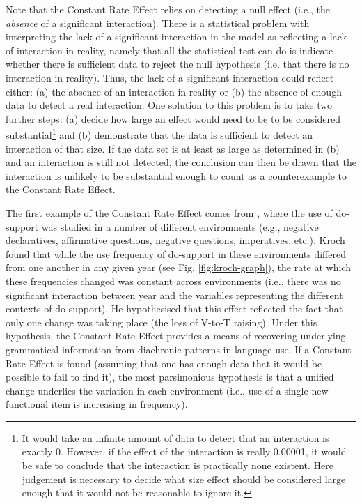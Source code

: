 	Note that the Constant Rate Effect relies on detecting a null effect (i.e., the \textit{absence} of a significant interaction). There is a statistical problem with interpreting the lack of a significant interaction in the model as reflecting a lack of interaction in reality, namely that all the statistical test can do is indicate whether there is sufficient data to reject the null hypothesis (i.e. that there is no interaction in reality). Thus, the lack of a significant interaction could reflect either: (a) the absence of an interaction in reality or (b) the absence of enough data to detect a real interaction. One solution to this problem is to take two further steps: (a) decide how large an effect would need to be to be considered substantial\footnote{It would take an infinite amount of data to detect that an interaction is exactly 0. However, if the effect of the interaction is really 0.00001, it would be safe to conclude that the interaction is practically none existent. Here judgement is necessary to decide what size effect should be considered large enough that it would not be reasonable to ignore it.} and (b) demonstrate that the data is sufficient to detect an interaction of that size. If the data set is at least as large as determined in (b) and an interaction is still not detected, the conclusion can then be drawn that the interaction is unlikely to be substantial enough to count as a counterexample to the Constant Rate Effect.

	The first example of the Constant Rate Effect comes from \cite{Kroch.1989}, where the use of do-support was studied in a number of different environments (e.g., negative declaratives, affirmative questions, negative questions, imperatives, etc.). Kroch found that while the use frequency of do-support in these environments differed from one another in any given year (see Fig. \ref{fig:kroch-graph}), the rate at which these frequencies changed was constant across environments (i.e., there was no significant interaction between year and the variables representing the different contexts of do support). He hypothesised that this effect reflected the fact that only one change was taking place (the loss of V-to-T raising). Under this hypothesis, the Constant Rate Effect provides a means of recovering underlying grammatical information from diachronic patterns in language use. If a Constant Rate Effect is found (assuming that one has enough data that it would be possible to fail to find it), the most parsimonious hypothesis is that a unified change underlies the variation in each environment (i.e., use of a single new functional item is increasing in frequency).

